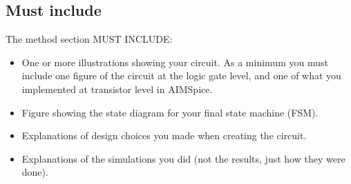\subsection{Must include}
The method section MUST INCLUDE:
\begin{itemize}
    \item One or more illustrations showing your circuit. As a minimum you must include one figure of the circuit at the logic gate level, and one of what you implemented at transistor level in AIMSpice.
    \item Figure showing the state diagram for your final state machine (FSM).
    \item Explanations of design choices you made when creating the circuit.
    \item Explanations of the simulations you did (not the results, just how they were done).
\end{itemize}